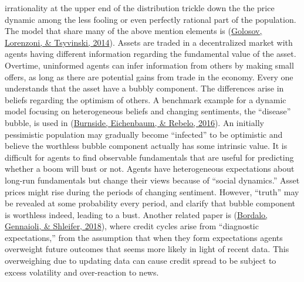 \documentclass[
  12pt,
]{article}
\begin{document}
irrationality at the upper end of the distribution trickle down the the price dynamic among the less fooling or even perfectly rational part of the population.
The model that share many of the above mention elements is (\protect\hyperlink{ref-golosov_decentralized_2014}{Golosov, Lorenzoni, \& Tsyvinski, 2014}). Assets are traded in a decentralized market with agents having different information regarding the fundamental value of the asset. Overtime, uninformed agents can infer information from others by making small offers, as long as there are potential gains from trade in the economy. Every one understands that the asset have a bubbly component. The differences arise in beliefs regarding the optimism of others.
A benchmark example for a dynamic model focusing on heterogeneous beliefs and changing sentiments, the ``disease'' bubble, is used in (\protect\hyperlink{ref-burnside_understanding_2016}{Burnside, Eichenbaum, \& Rebelo, 2016}). An initially pessimistic population may gradually become ``infected'' to be optimistic and believe the worthless bubble component actually has some intrinsic value. It is difficult for agents to find observable fundamentals that are useful for predicting whether a boom will bust or not. Agents have heterogeneous expectations about long-run fundamentals but change their views because of ``social dynamics.'' Asset prices might rise during the periods of changing sentiment. However, ``truth'' may be revealed at some probability every period, and clarify that bubble component is worthless indeed, leading to a bust. Another related paper is (\protect\hyperlink{ref-bordalo_diagnostic_2018}{Bordalo, Gennaioli, \& Shleifer, 2018}), where credit cycles arise from ``diagnostic expectations,'' from the assumption that when they form expectations agents overweight future outcomes that seems more likely in light of recent data. This overweighing due to updating data can cause credit spread to be subject to excess volatility and over-reaction to news.
\end{document}
